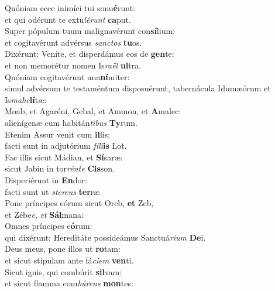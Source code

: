 \evenverse Quóniam ecce inimíci tui sonu\textbf{é}runt:~\*\\
\evenverse et qui odérunt te extu\textit{lé}\textit{runt} \textbf{ca}put.\\
\oddverse Super pópulum tuum malignavérunt con\textbf{sí}lium:~\*\\
\oddverse et cogitavérunt advérsus \textit{san}\textit{ctos} \textbf{tu}os.\\
\evenverse Dixérunt: Veníte, et disperdámus eos de \textbf{gen}te:~\*\\
\evenverse et non memorétur nomen Is\textit{ra}\textit{ël} \textbf{ul}tra.\\
\oddverse Quóniam cogitavérunt una\textbf{ní}miter:~\*\\
\oddverse simul advérsum te testaméntum disposuérunt, tabernácula Idumæórum et Is\textit{ma}\textit{he}\textbf{lí}tæ:\\
\evenverse Moab, et Agaréni, Gebal, et Ammon, et \textbf{A}malec:~\*\\
\evenverse alienígenæ cum habitán\textit{ti}\textit{bus} \textbf{Ty}rum.\\
\oddverse Etenim Assur venit cum \textbf{il}lis:~\*\\
\oddverse facti sunt in adjutórium \textit{fí}\textit{li}\textbf{is} Lot.\\
\evenverse Fac illis sicut Mádian, et \textbf{Sí}saræ:~\*\\
\evenverse sicut Jabin in tor\textit{rén}\textit{te} \textbf{Cis}son.\\
\oddverse Disperiérunt in \textbf{En}dor:~\*\\
\oddverse facti sunt ut \textit{ster}\textit{cus} \textbf{ter}ræ.\\
\evenverse Pone príncipes eórum sicut Oreb, \textbf{et} Zeb,~\*\\
\evenverse et Zébe\textit{e}, \textit{et} \textbf{Sál}mana:\\
\oddverse Omnes príncipes e\textbf{ó}rum:~\*\\
\oddverse qui dixérunt: Hereditáte possideámus Sanctuá\textit{ri}\textit{um} \textbf{De}i.\\
\evenverse Deus meus, pone illos ut \textbf{ro}tam:~\*\\
\evenverse et sicut stípulam ante fá\textit{ci}\textit{em} \textbf{ven}ti.\\
\oddverse Sicut ignis, qui combúrit \textbf{sil}vam:~\*\\
\oddverse et sicut flamma com\textit{bú}\textit{rens} \textbf{mon}tes:\\
